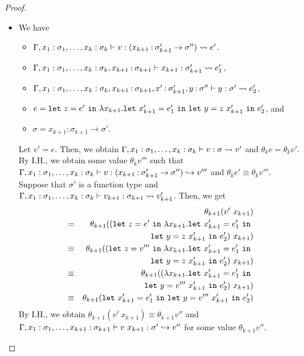 \begin{proof}
\begin{itemize}
\item[] 
We have
\begin{itemize}
\item \(\Gamma,x_1:\sigma_1,\dots,x_k:\sigma_k \vdash v : (x_{k+1}\mathbin{:}\sigma_{k+1}' \to \sigma'') \leadsto e'\).
\item \(\Gamma,x_1:\sigma_1,\dots,x_k:\sigma_k,x_{k+1}\mathbin{:}\sigma_{k+1} \vdash x_{k+1} : \sigma_{k+1}' \leadsto e_1'\),
\item \(\Gamma,x_1:\sigma_1,\dots,x_k:\sigma_k,x_{k+1}\mathbin{:}\sigma_{k+1},x'\mathbin{:}\sigma_{k+1}',y\mathbin{:} \sigma'' \vdash y : \sigma' \leadsto e_2'\),
\item \(e=\mathtt{let~}z=e'\mathtt{~in~}\lambda x_{k+1}.\mathtt{let~}x_{k+1}'=e_1'\mathtt{~in~}\mathtt{let~}y=z\ x_{k+1}'\mathtt{~in~}e_2'\), and
\item \(\sigma=x_{k+1}:\sigma_{k+1} \to \sigma'\).
\end{itemize}
Let \(v'=e\).
Then, we obtain \(\Gamma,x_1:\sigma_1,\dots,x_k:\sigma_k \vdash v : \sigma \leadsto v'\) and
\(\theta_k e=\theta_k v'\).
%
By I.H., we obtain some value \(\theta_k v'''\) such that
\(\Gamma,x_1:\sigma_1,\dots,x_k:\sigma_k \vdash v : (x_{k+1}\mathbin{:}\sigma_{k+1}' \to \sigma'') \hookrightarrow v'''\) and
\(\theta_k e' \equiv \theta_k v'''\).
%
Suppose that
\(\sigma'\) is a function type and
\(\Gamma,x_1:\sigma_1,\dots,x_k:\sigma_k \vdash v_{k+1} : \sigma_{k+1} \leadsto v_{k+1}'\).
%
Then, we get
\begin{eqnarray*}
&&\theta_{k+1} (v'\ x_{k+1}) \\
&=&\theta_{k+1}((\LETEQIN{z}{e'}\lambda x_{k+1}.\LETEQIN{x_{k+1}'}{e_1'} \\
&&\LETEQIN{y}{z\ x_{k+1}'}e_2')\ x_{k+1}) \\
&\equiv&\theta_{k+1}((\LETEQIN{z}{v'''}\lambda x_{k+1}.\LETEQIN{x_{k+1}'}{e_1'} \\
&&\LETEQIN{y}{z\ x_{k+1}'}e_2')\ x_{k+1}) \\
&\equiv&\theta_{k+1}((\lambda x_{k+1}.\LETEQIN{x_{k+1}'}{e_1'} \\
&&\LETEQIN{y}{v'''\ x_{k+1}'}e_2')\ x_{k+1}) \\
&\equiv& \theta_{k+1} (\LETEQIN{x_{k+1}'}{e_1'}\LETEQIN{y}{v'''\ x_{k+1}'}e_2')
\end{eqnarray*}
By I.H., we obtain \(\theta_{k+1} (v'\ x_{k+1}) \equiv \theta_{k+1} v''\) and
\(\TT{\Gamma,x_1:\sigma_1,\dots,x_{k+1}:\sigma_{k+1}}{v\ x_{k+1}}{\sigma'}{v''}\)
for some value \(\theta_{k+1} v''\).


\end{itemize}
\end{proof}
